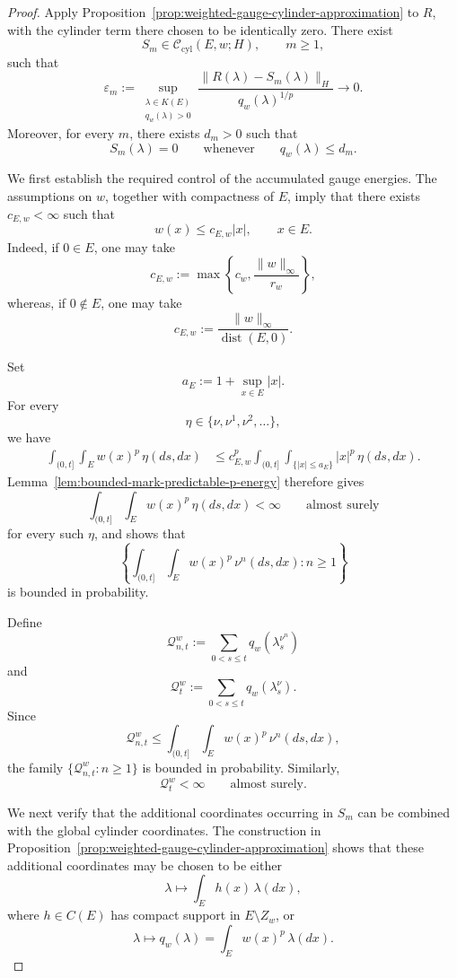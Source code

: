 \documentclass[a4paper,10pt]{article}
\begin{document}
\begin{proof}
Apply
Proposition~\ref{prop:weighted-gauge-cylinder-approximation}
to \(R\), with the cylinder term there chosen to be identically zero.
There exist
\[
        S_m\in\mathcal C_{\mathrm{cyl}}(E,w;H),
        \qquad m\ge1,
\]
such that
\[
        \varepsilon_m
        :=
        \sup_{\substack{\lambda\in K(E)\\q_w(\lambda)>0}}
        \frac{
        \lVert R(\lambda)-S_m(\lambda)\rVert_H
        }{
        q_w(\lambda)^{1/p}
        }
        \longrightarrow0.
\]
Moreover, for every \(m\), there exists \(d_m>0\) such that
\[
        S_m(\lambda)=0
        \qquad\text{whenever}\qquad
        q_w(\lambda)\le d_m.
\]

We first establish the required control of the accumulated gauge
energies. The assumptions on \(w\), together with compactness of
\(E\), imply that there exists \(c_{E,w}<\infty\) such that
\[
        w(x)\le c_{E,w}|x|,
        \qquad x\in E.
\]
Indeed, if \(0\in E\), one may take
\[
c_{E,w}
:=
\max\left\{
        c_w,
        \frac{\lVert w\rVert_\infty}{r_w}
\right\},
\]
whereas, if \(0\notin E\), one may take
\[
c_{E,w}
:=
\frac{\lVert w\rVert_\infty}
     {\operatorname{dist}(E,0)}.
\]

Set
\[
        a_E:=1+\sup_{x\in E}|x|.
\]
For every
\[
        \eta\in\{\nu,\nu^1,\nu^2,\ldots\},
\]
we have
\[
\begin{aligned}
\int_{(0,t]}\int_E
w(x)^p\,\eta(ds,dx)
&\le
c_{E,w}^p
\int_{(0,t]}\int_{\{|x|\le a_E\}}
|x|^p\,\eta(ds,dx).
\end{aligned}
\]
Lemma~\ref{lem:bounded-mark-predictable-p-energy} therefore gives
\[
\int_{(0,t]}\int_E
w(x)^p\,\eta(ds,dx)
<
\infty
\qquad\text{almost surely}
\]
for every such \(\eta\), and shows that
\[
\left\{
\int_{(0,t]}\int_E
w(x)^p\,\nu^n(ds,dx)
:
n\ge1
\right\}
\]
is bounded in probability.

Define
\[
        \mathcal Q_{n,t}^w
        :=
        \sum_{0<s\le t}
        q_w(\lambda_s^{\nu^n})
\]
and
\[
        \mathcal Q_t^w
        :=
        \sum_{0<s\le t}
        q_w(\lambda_s^\nu).
\]
Since
\[
\mathcal Q_{n,t}^w
\le
\int_{(0,t]}\int_E
w(x)^p\,\nu^n(ds,dx),
\]
the family
$
        \{\mathcal Q_{n,t}^w:n\ge1\}
$
is bounded in probability. Similarly,
\[
        \mathcal Q_t^w<\infty
        \qquad\text{almost surely}.
\]

We next verify that the additional coordinates occurring in \(S_m\)
can be combined with the global cylinder coordinates. The construction
in
Proposition~\ref{prop:weighted-gauge-cylinder-approximation}
shows that these additional coordinates may be chosen to be either
\[
        \lambda\longmapsto
        \int_Eh(x)\,\lambda(dx),
\]
where \(h\in C(E)\) has compact support in \(E\setminus Z_w\), or
\[
        \lambda\longmapsto
        q_w(\lambda)
        =
        \int_Ew(x)^p\,\lambda(dx).
\]


\end{proof}
\end{document}
